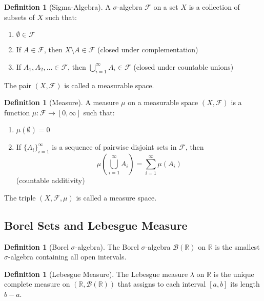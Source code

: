 \documentclass[12pt,a4paper]{article}
\theoremstyle{plain}
\theoremstyle{definition}
\newtheorem{definition}[theorem]{Definition}
\begin{document}
\begin{definition}[Sigma-Algebra]
A $\sigma$-algebra $\mathcal{F}$ on a set $X$ is a collection of subsets of $X$ such that:
\begin{enumerate}[label=(\roman*)]
\item $\emptyset \in \mathcal{F}$
\item If $A \in \mathcal{F}$, then $X \setminus A \in \mathcal{F}$ (closed under complementation)
\item If $A_1, A_2, \ldots \in \mathcal{F}$, then $\bigcup_{i=1}^{\infty} A_i \in \mathcal{F}$ (closed under countable unions)
\end{enumerate}
The pair $(X, \mathcal{F})$ is called a measurable space.
\end{definition}

\begin{definition}[Measure]
A measure $\mu$ on a measurable space $(X, \mathcal{F})$ is a function $\mu: \mathcal{F} \to [0, \infty]$ such that:
\begin{enumerate}[label=(\roman*)]
\item $\mu(\emptyset) = 0$
\item If $\{A_i\}_{i=1}^{\infty}$ is a sequence of pairwise disjoint sets in $\mathcal{F}$, then
\begin{equation}
\mu\left(\bigcup_{i=1}^{\infty} A_i\right) = \sum_{i=1}^{\infty} \mu(A_i)
\end{equation}
(countable additivity)
\end{enumerate}
The triple $(X, \mathcal{F}, \mu)$ is called a measure space.
\end{definition}

\subsection{Borel Sets and Lebesgue Measure}

\begin{definition}[Borel $\sigma$-algebra]
The Borel $\sigma$-algebra $\mathcal{B}(\mathbb{R})$ on $\mathbb{R}$ is the smallest $\sigma$-algebra containing all open intervals.
\end{definition}

\begin{definition}[Lebesgue Measure]
The Lebesgue measure $\lambda$ on $\mathbb{R}$ is the unique complete measure on $(\mathbb{R}, \mathcal{B}(\mathbb{R}))$ that assigns to each interval $[a,b]$ its length $b-a$.
\end{definition}
\end{document}
